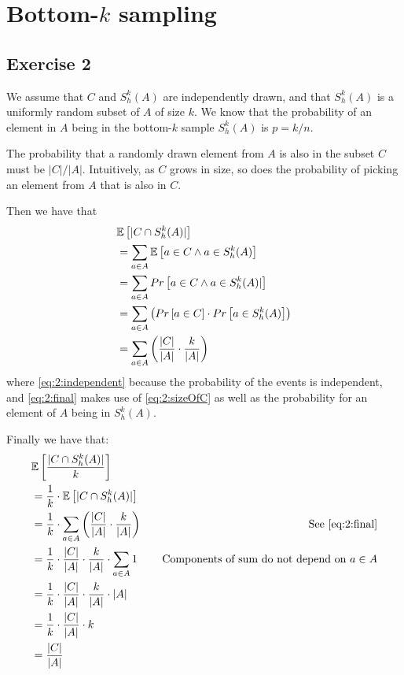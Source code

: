 \section{Bottom-$k$ sampling}

\subsection{Exercise 2}
We assume that $C$ and $S_h^k(A)$ are independently drawn, and that $S_h^k(A)$ is a uniformly
random subset of $A$ of size $k$. We know that the probability of an element in $A$ being
in the bottom-$k$ sample $S_h^k(A)$ is $p=k/n$.

The probability that a randomly drawn element from $A$ is also in the subset $C$
must be $|C|/|A|$. Intuitively, as $C$ grows in size, so does the probability of picking
an element from $A$ that is also in $C$.

Then we have that
\begin{align}
  & \mathbb{E} \left[ | C \cap S_h^k(A) | \right] \notag \\
  &= \sum_{a\in A} \mathbb{E}\left[ a \in C \land a \in S_h^k(A) \right] \notag \\
  &= \sum_{a\in A} Pr\left[ a \in C \land a \in S_h^k(A) | \right] \notag \\
  &= \sum_{a\in A} \left( Pr\left[ a \in C \right] \cdot Pr\left[ a \in S_h^k(A) \right] \right) 
    \label{eq:2:independent} \\
  &= \sum_{a\in A} \left( \frac{|C|}{|A|} \cdot \frac{k}{|A|} \right) \label{eq:2:final}
\end{align}
where \eqref{eq:2:independent} because the probability of the events is independent, and \eqref{eq:2:final} makes use of \eqref{eq:2:sizeOfC} as well as the probability for an element of
$A$ being in $S_h^k(A)$.

Finally we have that:
\begin{align*}
  & \mathbb{E}\left[ \frac{| C \cap S_h^k(A) |}{k}\right] & \\
  &= \frac{1}{k} \cdot \mathbb{E}\left[ | C \cap S_h^k(A) |\right] & \\
  &= \frac{1}{k} \cdot \sum_{a\in A} \left( \frac{|C|}{|A|} \cdot \frac{k}{|A|} \right) 
    & \quad \text{See \eqref{eq:2:final}} \\
  &= \frac{1}{k} \cdot \frac{|C|}{|A|} \cdot \frac{k}{|A|} \cdot \sum_{a\in A} 1
    & \quad \text{Components of sum do not depend on $a\in A$} \\
  &= \frac{1}{k} \cdot \frac{|C|}{|A|} \cdot \frac{k}{|A|} \cdot |A| & \\
  &= \frac{1}{k} \cdot \frac{|C|}{|A|} \cdot k & \\
  &= \frac{|C|}{|A|}
\end{align*}

